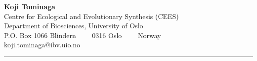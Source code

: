 \documentclass[11pt, a4paper]{article}
\begin{document}
\selectfont


\begin{center}
{\LARGE \textbf{Koji Tominaga}}
\\
Centre for Ecological and Evolutionary Synthesis (CEES)\\
Department of Biosciences, University of Oslo\\
P.O. Box 1066 Blindern\ \ \textbullet
\ \ 0316 Oslo\ \ \textbullet 
\ \ Norway
\\
koji.tominaga@ibv.uio.no
\end{center}

\hrule
\vspace{-0.4em}








\end{document}
